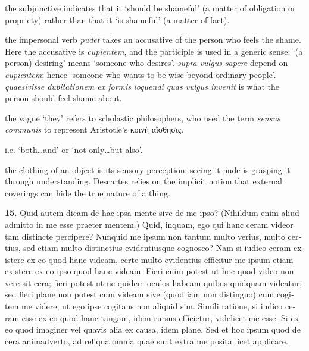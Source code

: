  the subjunctive indicates that it `should be shameful' (a matter of obligation or propriety) rather than that it `is shameful' (a matter of fact).

 the impersonal verb \textit{pudet} takes an accusative of the person who feels the shame. Here the accusative is \textit{cupientem}, and the participle is used in a generic sense: `(a person) desiring' means `someone who desires'. \textit{supra vulgus sapere} depend on \textit{cupientem}; hence `someone who wants to be wise beyond ordinary people'. \textit{quaesivisse dubitationem ex formis loquendi quas vulgus invenit} is what the person should feel shame about.

 the vague `they' refers to scholastic philosophers, who used the term \textit{sensus communis} to represent Aristotle's κοινὴ αἴσθησις.

 i.e. `both\dots and' or `not only\dots but also'.

 the clothing of an object is its sensory perception; seeing it nude is grasping it through understanding. Descartes relies on the implicit notion that external coverings can hide the true nature of a thing.

\clearpage

\beginnumbering
\pstart
\begin{latin}
    \textenglish{\textbf{15.}} Quid autem dicam de hac ipsa mente sive de me ipso? (Nihildum enim aliud admitto in me esse praeter mentem.) Quid, inquam, ego qui hanc ceram videor tam distincte percipere? Nunquid me ipsum non tantum multo verius, multo certius, sed etiam multo distinctius evidentiusque cognosco? Nam si iudico ceram existere ex eo quod hanc videam, certe multo evidentius efficitur me ipsum etiam existere ex eo ipso quod hanc videam. Fieri enim potest ut hoc quod video non vere sit cera; fieri potest ut ne quidem oculos habeam quibus quidquam videatur; sed fieri plane non potest cum videam sive (quod iam non distinguo) cum cogitem me videre, ut ego ipse cogitans non aliquid sim. Simili ratione, si iudico ceram esse ex eo quod hanc tangam, idem rursus efficietur, videlicet me esse. Si ex eo quod imaginer vel quavis alia ex causa, idem plane. Sed et hoc ipsum quod de cera animadverto, ad reliqua omnia quae sunt extra me posita licet applicare.
\end{latin}
\pend
\endnumbering

